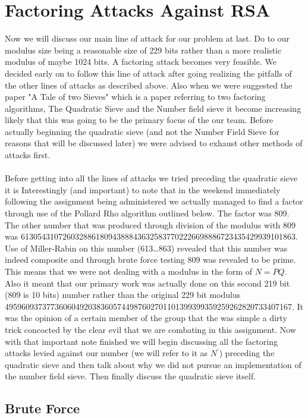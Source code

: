 \documentclass[12pt]{article} %
\begin{document}
\section{Factoring Attacks Against RSA}
Now we will discuss our main line of attack for our problem at last. Do to our modulus size being a reasonable size of 229 bits rather than a more realistic modulus of maybe 1024 bits. A factoring attack becomes very feasible. We decided early on to follow this line of attack after going realizing the pitfalls of the other lines of attacks as described above. Also when we were suggested the paper "A Tale of two Sieves" which is a paper referring to two factoring algorithms, The Quadratic Sieve and the Number field sieve it become increasing likely that this was going to be the primary focus of the our team. Before actually beginning the quadratic sieve (and not the Number Field Sieve for reasons that will be discussed later) we were advised to exhaust other methods of attacks first. 
\\\\
\indent Before getting into all the lines of attacks we tried preceding the quadratic sieve it is Interestingly (and important) to note that in the weekend immediately following the assignment being administered we actually managed to find a factor through use of the Pollard Rho algorithm outlined below. The factor was 809. The other number that was produced through division of the modulus with 809 was 613054310726032886180943888436325837702226698886723435429939101863. Use of Miller-Rabin on this number (613\dots863) revealed that this number was indeed composite and through brute force testing 809 was revealed to be prime. This means that we were not dealing with a modulus in the form of $N=PQ$. Also it meant that our primary work was actually done on this second 219 bit (809 is 10 bits) number rather than the original 229 bit modulus 495960937377360604920383605744987602701101399399359259262820733407167. It was the opinion of a certain member of the group that the was simple a dirty trick concocted by the clear evil that we are combating in this assignment. Now with that important note finished we will begin discussing all the factoring attacks levied against our number (we will refer to it as $N^{'}$) preceding the quadratic sieve and then talk about why we did not pursue an implementation of the number field sieve. Then finally discuss the quadratic sieve itself.    
\subsection{Brute Force}
\end{document}
